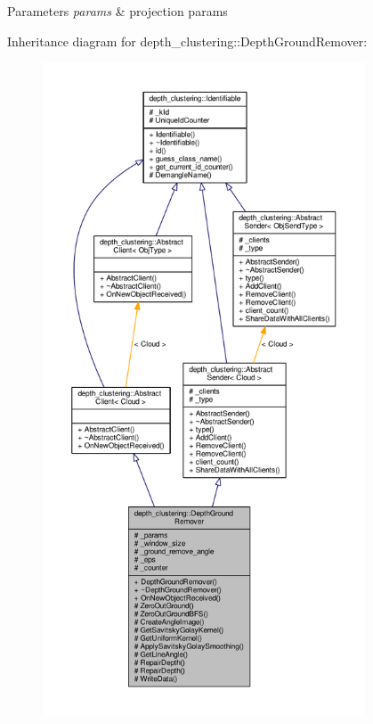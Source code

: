 \begin{DoxyParams}{Parameters}
{\em params} & projection params \\
\hline
\end{DoxyParams}


Inheritance diagram for depth\-\_\-clustering\-:\-:Depth\-Ground\-Remover\-:
\nopagebreak
\begin{figure}[H]
\begin{center}
\leavevmode
\includegraphics[height=550pt]{classdepth__clustering_1_1DepthGroundRemover__inherit__graph}
\end{center}
\end{figure}


